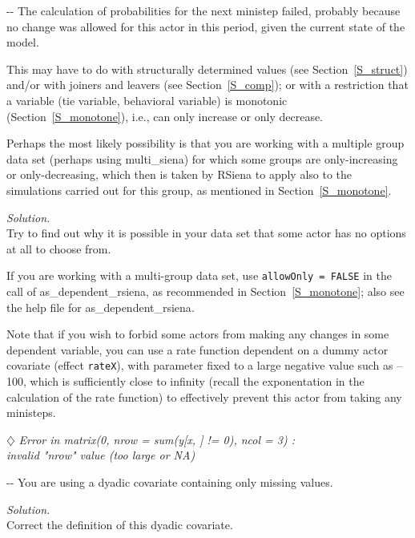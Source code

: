 \documentclass[a4paper,fleqn,11pt]{article}
\makeatletter
\newcommand{\+}{\, + \,}
\newcommand{\RS}{{\sf \textsf{RSiena} }}
\newenvironment{indentation}[2]
{\par \setlength{\leftmargin}{#1}       \setlength{\rightmargin}{#2}
  \advance\linewidth -\leftmargin       \advance\linewidth -\rightmargin
  \advance\@totalleftmargin\leftmargin  \@setpar{{\@@par}}%
  \parshape 1 \@totalleftmargin         \linewidth \ignorespaces}{\par}
\makeatother
\begin{document}
\begin{indentation}{0.04\textwidth}{0pt}
\noindent
The calculation of probabilities for the next ministep failed,
probably because no change was allowed for this actor in this period,
given the current state of the model.

This may have to do with structurally determined values
(see Section~\ref{S_struct})
and/or with joiners and leavers (see Section~\ref{S_comp});
or with a restriction that a variable (tie variable, behavioral variable)
is monotonic (Section~\ref{S_monotone}), i.e., can only
increase or only decrease.

Perhaps the most likely possibility is that you are working with a
multiple group data set (perhaps using \textsf{multi\_siena})
for which some groups are only-increasing or only-decreasing,
which then is taken by \RS to apply also to the simulations carried
out for this group, as mentioned in Section~\ref{S_monotone}.
\smallskip

\noindent
\emph{Solution.} \\
Try to find out why it is possible in your data set
that some actor has no options at all to choose from.

If you are working with a multi-group data set, use
\texttt{allowOnly = FALSE} in the call of \textsf{as\_dependent\_rsiena},
as recommended in Section~\ref{S_monotone}; also see the help file for
\textsf{as\_dependent\_rsiena}.

Note that if you wish to forbid some actors from making any changes
in some dependent variable, you can use a rate function dependent
on a dummy actor covariate (effect \texttt{rateX}), with parameter fixed
to a large negative value such as --100, which is sufficiently close to
infinity (recall the exponentation in the calculation of the rate function)
to effectively prevent this actor from taking any ministeps.
\end{indentation}
\bigskip

\noindent $\diamondsuit$ \emph{
Error in matrix(0, nrow = sum(y[x, ] != 0), ncol = 3) :\\
  invalid "nrow" value (too large or NA) }
\smallskip

\begin{indentation}{0.04\textwidth}{0pt}
\noindent
You are using a dyadic covariate containing only missing values.
\smallskip

\noindent
\emph{Solution.} \\
Correct the definition of this dyadic covariate.
\end{indentation}
\bigskip
\end{document}
